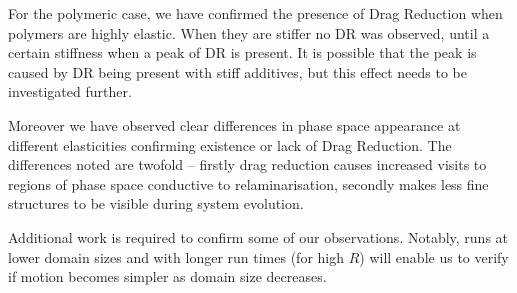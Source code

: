 \documentclass[11pt,a4paper]{article}
\begin{document}
For the polymeric case, we have confirmed the presence of Drag Reduction when polymers are highly elastic.
When they are stiffer no DR was observed, until a certain stiffness when a peak of DR is present.
It is possible that the peak is caused by DR being present with stiff additives, but this effect needs to be investigated further.

Moreover we have observed clear differences in phase space appearance at different elasticities confirming existence or lack of Drag Reduction.
The differences noted are twofold -- firstly drag reduction causes increased visits to regions of phase space conductive to relaminarisation, secondly makes less fine structures to be visible during system evolution.


Additional work is required to confirm some of our observations.
Notably, runs at lower domain sizes and with longer run times (for high $R$) will enable us to verify if motion becomes simpler as domain size decreases.


\newpage


\end{document}
